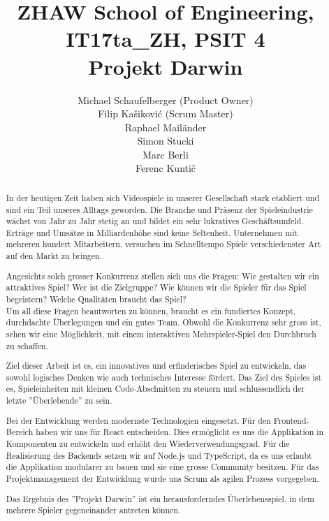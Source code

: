 \documentclass[11pt,a4paper,titlepage]{article}
\author{
Michael Schaufelberger (Product Owner)\\
Filip Kašiković (Scrum Master)\\
Raphael Mailänder\\
Simon Stucki\\
Marc Berli\\
Ferenc Kuntič}
\title{{\small ZHAW School of Engineering, 
IT17ta\_ZH, 
PSIT 4}\\
Projekt Darwin}
\begin{document}
\maketitle

\begin{otherlanguage}{english}
\begin{abstract}

In der heutigen Zeit haben sich Videospiele in unserer Gesellschaft stark etabliert und sind ein Teil unseres Alltags geworden. Die Branche und Präsenz der Spieleindustrie wächst von Jahr zu Jahr stetig an und bildet ein sehr lukratives Geschäftsumfeld. Erträge und Umsätze in Milliardenhöhe sind keine Seltenheit. Unternehmen mit mehreren hundert Mitarbeitern, versuchen im Schnelltempo Spiele verschiedenster Art auf den Markt zu bringen. 

Angesichts solch grosser Konkurrenz stellen sich uns die Fragen: Wie gestalten wir ein attraktives Spiel? Wer ist die Zielgruppe? Wie können wir die Spieler für das Spiel begeistern? Welche Qualitäten braucht das Spiel?
\\Um all diese Fragen beantworten zu können, braucht es ein fundiertes Konzept, durchdachte Überlegungen und ein gutes Team. Obwohl die Konkurrenz sehr gross ist, sehen wir eine Möglichkeit, mit einem interaktiven Mehrspieler-Spiel den Durchbruch zu schaffen.

Ziel dieser Arbeit ist es, ein innovatives und erfinderisches Spiel zu entwickeln, das sowohl logisches Denken wie auch technisches Interesse fördert. Das Ziel des Spieles ist es, Spieleinheiten mit kleinen Code-Abschnitten zu steuern und schlussendlich der letzte ''Überlebende'' zu sein.

Bei der Entwicklung werden modernste Technologien eingesetzt. Für den Frontend-Bereich haben wir uns für React entscheiden. Dies ermöglicht es uns die Applikation in Komponenten zu entwickeln und erhöht den Wiederverwendungsgrad. Für die Realisierung des Backends setzen wir auf Node.js und TypeScript, da es uns erlaubt die Applikation modularer zu bauen und sie eine grosse Community besitzen.
Für das Projektmanagement der Entwicklung wurde uns Scrum als agilen Prozess vorgegeben.

Das Ergebnis des ''Projekt Darwin'' ist ein herausforderndes Überlebensspiel, in dem mehrere Spieler gegeneinander antreten können.

\end{abstract}
\end{otherlanguage}
\end{document}
